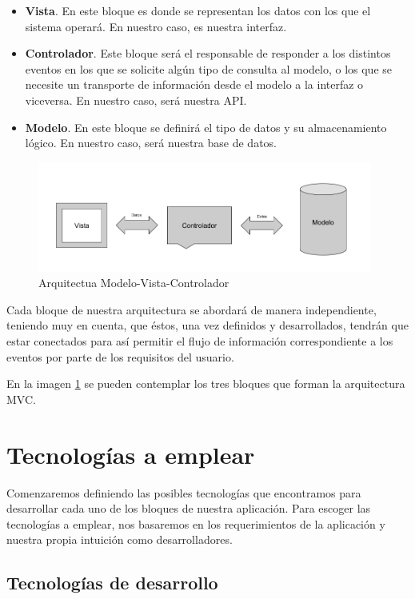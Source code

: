  \begin{itemize}
    \item \textbf{Vista}. En este bloque es donde se representan los datos con los que el sistema operará. En nuestro caso, es nuestra interfaz.
    \item \textbf{Controlador}. Este bloque será el responsable de responder a los distintos eventos en los que se solicite algún tipo de consulta al modelo, o los que se necesite un transporte de información desde el modelo a la interfaz o viceversa. En nuestro caso, será nuestra API.
    \item \textbf{Modelo}. En este bloque se definirá el tipo de datos y su almacenamiento lógico. En nuestro caso, será nuestra base de datos.
\end{itemize}
\begin{figure}[htbp]
    \centerline{\includegraphics[width=11cm]{figuras/mvc.png}}
    \caption{Arquitectua Modelo-Vista-Controlador}
    \label{fig::mvc}
\end{figure}
Cada bloque de nuestra arquitectura se abordará de manera independiente, teniendo muy en cuenta, que éstos, una vez definidos y desarrollados, tendrán que estar conectados para así permitir el flujo de información correspondiente a los eventos por parte de los requisitos del usuario. 

En la imagen \ref{fig::mvc} se pueden contemplar los tres bloques que forman la arquitectura MVC.


 
\section{Tecnologías a emplear}

Comenzaremos definiendo las posibles tecnologías que encontramos para desarrollar cada uno de los bloques de nuestra aplicación. Para escoger las tecnologías a emplear, nos basaremos en los requerimientos de la aplicación y nuestra propia intuición como desarrolladores.

\subsection{Tecnologías de desarrollo}


